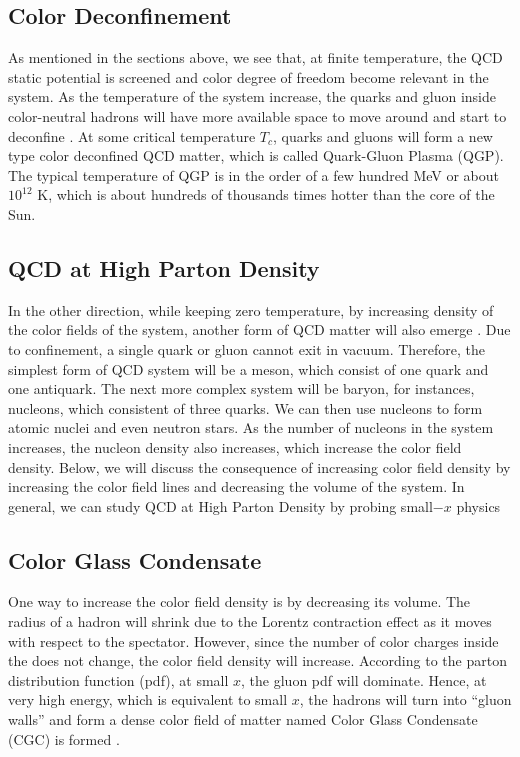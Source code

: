 \subsection{Color Deconfinement}

As mentioned in the sections above, we see that, at finite temperature, the QCD static potential is screened and color degree of freedom become relevant in the system. As the temperature of the system increase, the quarks and gluon inside color-neutral hadrons will have more available space to move around and start to deconfine \cite{DeconfineTemp}. At some critical temperature $T_c$, quarks and gluons will form a new type color deconfined QCD matter, which is called Quark-Gluon Plasma (QGP). The typical temperature of QGP is in the order of a few hundred MeV or about $10^{12}$ K, which is about hundreds of thousands times hotter than the core of the Sun.

\subsection{QCD at High Parton Density}

In the other direction, while keeping zero temperature, by increasing density of the color fields of the system, another form of QCD matter will also emerge \cite{CondensedQCD}. Due to confinement, a single quark or gluon cannot exit in vacuum. Therefore, the simplest form of QCD system will be a meson, which consist of one quark and one antiquark. The next more complex system will be baryon, for instances, nucleons, which consistent of three quarks. We can then use nucleons to form atomic nuclei and even neutron stars. As the number of nucleons in the system increases, the nucleon density also increases, which increase the color field density. Below, we will discuss the consequence of increasing color field density by increasing the color field lines and decreasing the volume of the system. In general, we can study QCD at High Parton Density by probing small$-x$ physics \cite{SmallX}  


\subsection{Color Glass Condensate}

One way to increase the color field density is by decreasing its volume. The radius of a hadron will shrink due to the Lorentz contraction effect as it moves with respect to the spectator. However, since the number of color charges inside the does not change, the color field density will increase. According to the parton distribution function (pdf), at small $x$, the gluon pdf will dominate. Hence, at very high energy, which is equivalent to small $x$, the hadrons will turn into ``gluon walls'' \cite{GluonWalls} and form a dense color field of matter \cite{DenseColorField} named Color Glass Condensate (CGC) is formed \cite{CGCPaper}. %

